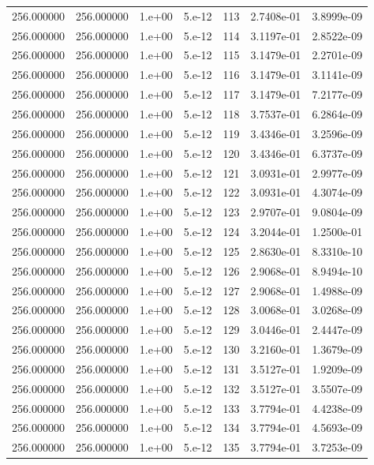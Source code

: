 \begin{table}[htbp]
\begin{tabular}{rrrrrrr}
256.000000 & 256.000000 & 1.e+00 & 5.e-12 & 113 & 2.7408e-01 & 3.8999e-09 \\
256.000000 & 256.000000 & 1.e+00 & 5.e-12 & 114 & 3.1197e-01 & 2.8522e-09 \\
256.000000 & 256.000000 & 1.e+00 & 5.e-12 & 115 & 3.1479e-01 & 2.2701e-09 \\
256.000000 & 256.000000 & 1.e+00 & 5.e-12 & 116 & 3.1479e-01 & 3.1141e-09 \\
256.000000 & 256.000000 & 1.e+00 & 5.e-12 & 117 & 3.1479e-01 & 7.2177e-09 \\
256.000000 & 256.000000 & 1.e+00 & 5.e-12 & 118 & 3.7537e-01 & 6.2864e-09 \\
256.000000 & 256.000000 & 1.e+00 & 5.e-12 & 119 & 3.4346e-01 & 3.2596e-09 \\
256.000000 & 256.000000 & 1.e+00 & 5.e-12 & 120 & 3.4346e-01 & 6.3737e-09 \\
256.000000 & 256.000000 & 1.e+00 & 5.e-12 & 121 & 3.0931e-01 & 2.9977e-09 \\
256.000000 & 256.000000 & 1.e+00 & 5.e-12 & 122 & 3.0931e-01 & 4.3074e-09 \\
256.000000 & 256.000000 & 1.e+00 & 5.e-12 & 123 & 2.9707e-01 & 9.0804e-09 \\
256.000000 & 256.000000 & 1.e+00 & 5.e-12 & 124 & 3.2044e-01 & 1.2500e-01 \\
256.000000 & 256.000000 & 1.e+00 & 5.e-12 & 125 & 2.8630e-01 & 8.3310e-10 \\
256.000000 & 256.000000 & 1.e+00 & 5.e-12 & 126 & 2.9068e-01 & 8.9494e-10 \\
256.000000 & 256.000000 & 1.e+00 & 5.e-12 & 127 & 2.9068e-01 & 1.4988e-09 \\
256.000000 & 256.000000 & 1.e+00 & 5.e-12 & 128 & 3.0068e-01 & 3.0268e-09 \\
256.000000 & 256.000000 & 1.e+00 & 5.e-12 & 129 & 3.0446e-01 & 2.4447e-09 \\
256.000000 & 256.000000 & 1.e+00 & 5.e-12 & 130 & 3.2160e-01 & 1.3679e-09 \\
256.000000 & 256.000000 & 1.e+00 & 5.e-12 & 131 & 3.5127e-01 & 1.9209e-09 \\
256.000000 & 256.000000 & 1.e+00 & 5.e-12 & 132 & 3.5127e-01 & 3.5507e-09 \\
256.000000 & 256.000000 & 1.e+00 & 5.e-12 & 133 & 3.7794e-01 & 4.4238e-09 \\
256.000000 & 256.000000 & 1.e+00 & 5.e-12 & 134 & 3.7794e-01 & 4.5693e-09 \\
256.000000 & 256.000000 & 1.e+00 & 5.e-12 & 135 & 3.7794e-01 & 3.7253e-09 \\

\end{tabular}
\end{table}
